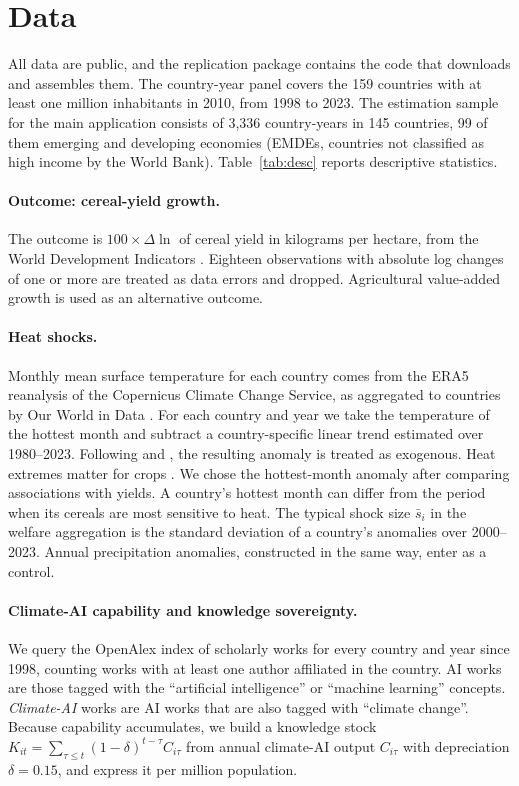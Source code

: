 \section{Data}\label{sec:data}

All data are public, and the replication package contains the code that downloads and assembles
them. The country-year panel covers the 159 countries with at least one million inhabitants in 2010,
from 1998 to 2023. The estimation sample for the main application consists of 3,336 country-years
in 145 countries, 99 of them emerging and developing economies (EMDEs, countries not classified as
high income by the World Bank). Table~\ref{tab:desc} reports descriptive statistics.

\paragraph{Outcome: cereal-yield growth.} The outcome is $100\times\Delta\ln$ of cereal yield in
kilograms per hectare, from the World Development Indicators \citep[WDI;][]{wdi2026}. Eighteen observations with
absolute log changes of one or more are treated as data errors and dropped. Agricultural
value-added growth is used as an alternative outcome.

\paragraph{Heat shocks.} Monthly mean surface temperature for each country comes from the ERA5
reanalysis of the Copernicus Climate Change Service, as aggregated to countries by Our World in
Data \citep{hersbach2020,copernicus2019,owid2026}. For each country and year we take the temperature of the hottest month and subtract a
country-specific linear trend estimated over 1980--2023. Following \citet{dell2012} and
\citet{burke2015}, the resulting anomaly is treated as exogenous. Heat extremes matter for crops \citep{schlenker2009}. We chose the hottest-month anomaly
after comparing associations with yields. A country's hottest month can differ from the
period when its cereals are most sensitive to heat. The typical shock size $\bar s_i$ in the welfare aggregation is the standard
deviation of a country's anomalies over 2000--2023. Annual precipitation anomalies, constructed in
the same way, enter as a control.

\paragraph{Climate-AI capability and knowledge sovereignty.} We query the OpenAlex index of
scholarly works \citep{priem2022} for every country and year since 1998, counting works with at
least one author affiliated in the country. AI works are those tagged with the ``artificial
intelligence'' or ``machine learning'' concepts. \emph{Climate-AI} works are AI works that are also
tagged with ``climate change''. Because capability accumulates, we build a knowledge stock
$K_{it}=\sum_{\tau\le t}(1-\delta)^{t-\tau}C_{i\tau}$ from annual climate-AI output $C_{i\tau}$ with
depreciation $\delta=0.15$, and express it per million population.

